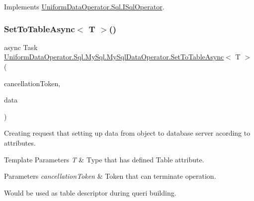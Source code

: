 Implements \mbox{\hyperlink{interface_uniform_data_operator_1_1_sql_1_1_i_sql_operator_a35ef3899954f213e391751e9cda09322}{Uniform\+Data\+Operator.\+Sql.\+I\+Sql\+Operator}}.

\mbox{\label{class_uniform_data_operator_1_1_sql_1_1_my_sql_1_1_my_sql_data_operator_ac615a17b6330b292dcf3fd912e1f4fe2}} 
\subsubsection{\texorpdfstring{Set\+To\+Table\+Async$<$ T $>$()}{SetToTableAsync< T >()}}
{\footnotesize\ttfamily async Task \mbox{\hyperlink{class_uniform_data_operator_1_1_sql_1_1_my_sql_1_1_my_sql_data_operator_a036b234868363f2f680e5157ee459439}{Uniform\+Data\+Operator.\+Sql.\+My\+Sql.\+My\+Sql\+Data\+Operator.\+Set\+To\+Table\+Async}}$<$ T $>$ (\begin{DoxyParamCaption}\item[{Cancellation\+Token}]{cancellation\+Token,  }\item[{object}]{data }\end{DoxyParamCaption})}



Creating request that setting up data from object to database server acording to attributes. 


\begin{DoxyTemplParams}{Template Parameters}
{\em T} & Type that has defined Table attribute. 
\begin{DoxyParams}{Parameters}
{\em cancellation\+Token} & Token that can terminate operation.\\
\hline
\end{DoxyParams}
Would be used as table descriptor during queri building.\\
\hline
\end{DoxyTemplParams}

